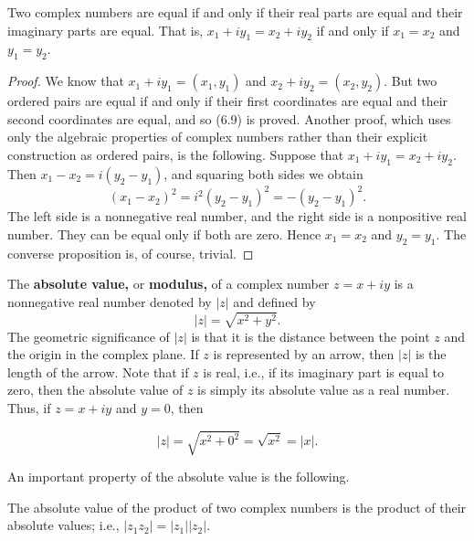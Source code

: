\begin{theorem} %
Two complex numbers are equal if and only if their real parts are equal and their imaginary parts are equal. That is, $x_{1} + iy_{1} = x_{2} + iy_{2}$ if and only if $x_{1} = x_{2}$ and $y_{1} = y_{2}$.
\end{theorem}


\begin{proof}
We know that $x_{1} + iy_{1} = (x_{1}, y_{1})$ and $x_{2} + iy_{2} = (x_{2}, y_{2})$. But two ordered pairs are equal if and only if their first coordinates are equal and their second coordinates are equal, and so (6.9) is proved. Another proof, which uses only the algebraic properties of complex numbers rather than their explicit construction as ordered pairs, is the following.  Suppose that $x_{1} + iy_{1} = x_{2} + iy_{2}$. Then $x_{1} - x_{2} = i(y_{2} - y_{1})$, and squaring both sides we obtain
$$
(x_{1} - x_{2})^2 = i^{2}(y_{2} - y_{1})^2 = - (y_{2} - y_{1})^2.
$$
The left side is a nonnegative real number, and the right side is a nonpositive real number. 
They can be equal only if both are zero. Hence $x_{1} = x_{2}$ and $y_{2} = y_{1}$. 
The converse proposition is, of course, trivial.
\end{proof}

The \textbf{absolute value,} or \textbf{modulus,}  of a complex number $z = x + iy$ is a nonnegative real number denoted by $|z|$ and defined by
$$
|z| = \sqrt{x^2 + y^2}.
$$
The geometric significance of $|z|$ is that it is the distance between the point $z$ and the origin 
in the complex plane. If $z$ is represented by an arrow, then $|z|$ is the length of the arrow. 
Note that if $z$ is real, i.e., if its imaginary part is equal to zero, then the absolute value of $z$ 
is simply its absolute value as a real number. Thus, if $z = x + iy$ and $y = 0$, then

$$
|z| = \sqrt{x^2+ 0^2} = \sqrt{x^2} = |x|.
$$

An important property of the absolute value is the following.

\begin{theorem} %
The absolute value of the product of two complex numbers is the product of their absolute values; i.e., $|z_{1}z_{2}| = |z_{1}| |z_{2}|$.
\end{theorem}

